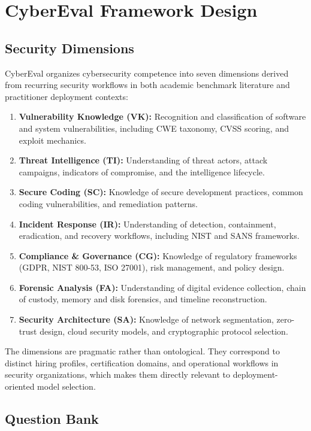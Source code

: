 \documentclass[journal]{IEEEtran}
\begin{document}
\section{CyberEval Framework Design}

\subsection{Security Dimensions}

CyberEval organizes cybersecurity competence into seven dimensions derived from recurring security workflows in both academic benchmark literature and practitioner deployment contexts:

\begin{enumerate}[leftmargin=*,nosep]
    \item \textbf{Vulnerability Knowledge (VK):} Recognition and classification of software and system vulnerabilities, including CWE taxonomy, CVSS scoring, and exploit mechanics.
    \item \textbf{Threat Intelligence (TI):} Understanding of threat actors, attack campaigns, indicators of compromise, and the intelligence lifecycle.
    \item \textbf{Secure Coding (SC):} Knowledge of secure development practices, common coding vulnerabilities, and remediation patterns.
    \item \textbf{Incident Response (IR):} Understanding of detection, containment, eradication, and recovery workflows, including NIST and SANS frameworks.
    \item \textbf{Compliance \& Governance (CG):} Knowledge of regulatory frameworks (GDPR, NIST 800-53, ISO 27001), risk management, and policy design.
    \item \textbf{Forensic Analysis (FA):} Understanding of digital evidence collection, chain of custody, memory and disk forensics, and timeline reconstruction.
    \item \textbf{Security Architecture (SA):} Knowledge of network segmentation, zero-trust design, cloud security models, and cryptographic protocol selection.
\end{enumerate}

The dimensions are pragmatic rather than ontological. They correspond to distinct hiring profiles, certification domains, and operational workflows in security organizations, which makes them directly relevant to deployment-oriented model selection.

\subsection{Question Bank}
\end{document}
